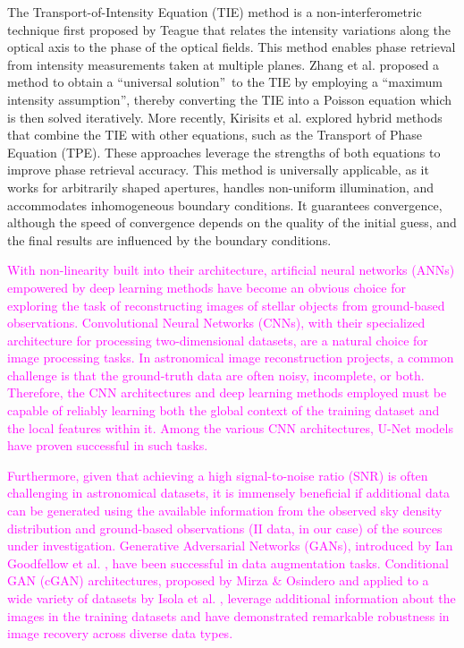 The Transport-of-Intensity Equation (TIE) method is a non-interferometric technique first proposed by Teague \citep{Teague1983} that relates the intensity variations along the optical axis to the phase of the optical fields. This method enables phase retrieval from intensity measurements taken at multiple planes. Zhang et al. \citep{Zhang2020} proposed a method to obtain a \textquotedblleft universal solution\textquotedblright\ to the TIE by employing a \textquotedblleft maximum intensity assumption\textquotedblright, thereby converting the TIE into a Poisson equation which is then solved iteratively. More recently, Kirisits et al. \citep{Kirisits2024} explored hybrid methods that combine the TIE with other equations, such as the Transport of Phase Equation (TPE). These approaches leverage the strengths of both equations to improve phase retrieval accuracy. This method is universally applicable, as it works for arbitrarily shaped apertures, handles non-uniform illumination, and accommodates inhomogeneous boundary conditions. It guarantees convergence, although the speed of convergence depends on the quality of the initial guess, and the final results are influenced by the boundary conditions.

\textcolor{magenta}{With non-linearity built into their architecture, artificial neural networks (ANNs) empowered by deep learning methods have become an obvious choice for exploring the task of reconstructing images of stellar objects from ground-based observations. Convolutional Neural Networks (CNNs), with their specialized architecture for processing two-dimensional datasets, are a natural choice for image processing tasks. In astronomical image reconstruction projects, a common challenge is that the ground-truth data are often noisy, incomplete, or both. Therefore, the CNN architectures and deep learning methods employed must be capable of reliably learning both the global context of the training dataset and the local features within it. Among the various CNN architectures, U-Net models \citep{ronneberger2015u} have proven successful in such tasks.}

\textcolor{magenta}{Furthermore, given that achieving a high signal-to-noise ratio (SNR) is often challenging in astronomical datasets, it is immensely beneficial if additional data can be generated using the available information from the observed sky density distribution and ground-based observations (II data, in our case) of the sources under investigation. Generative Adversarial Networks (GANs), introduced by Ian Goodfellow et al. \citep{goodfellow2014generative}, have been successful in data augmentation tasks. Conditional GAN (cGAN) architectures, proposed by Mirza \& Osindero \citep{mirza2014conditional} and applied to a wide variety of datasets by Isola et al. \citep{isola2017image}, leverage additional information about the images in the training datasets and have demonstrated remarkable robustness in image recovery across diverse data types.}

